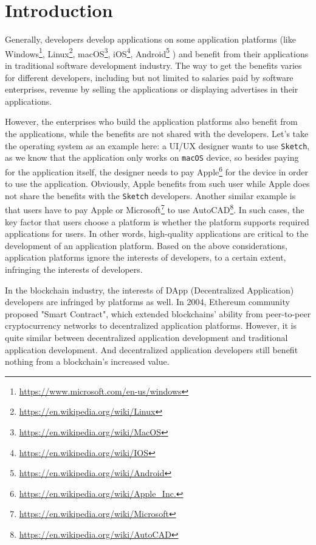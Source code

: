 \section{Introduction}

Generally, developers develop applications on some application platforms (like
Windows\footnote{\url{https://www.microsoft.com/en-us/windows}}, Linux\footnote{\url{https://en.wikipedia.org/wiki/Linux}},
macOS\footnote{\url{https://en.wikipedia.org/wiki/MacOS}},
iOS\footnote{\url{https://en.wikipedia.org/wiki/IOS}},
Android\footnote{\url{https://en.wikipedia.org/wiki/Android}} \etc) and
benefit from their applications in traditional software development industry.
The way to get the benefits varies for different developers, including but not
limited to salaries paid by software enterprises, revenue by selling the
applications or displaying advertises in their applications.

However, the enterprises who build the application platforms also benefit
from the applications, while the benefits are not shared with the developers.
Let's take the operating system as an example here: a UI/UX designer wants to use \texttt{Sketch},
as we know that the application only works on \texttt{macOS} device, so besides
paying for the application itself, the designer needs to pay Apple\footnote{\url{https://en.wikipedia.org/wiki/Apple_Inc.}}
for the device in order to use the application. Obviously, Apple benefits from such user while
Apple does not share the benefits with the \texttt{Sketch} developers.
Another similar example is that users have to pay Apple or
Microsoft\footnote{\url{https://en.wikipedia.org/wiki/Microsoft}} to use
AutoCAD\footnote{\url{https://en.wikipedia.org/wiki/AutoCAD}}. In such cases,
the key factor that users choose a platform is whether the platform
supports required applications for users. In other words, high-quality
applications are critical to the development of an application platform. Based on the above considerations,  application platforms ignore the interests of developers, to a certain extent, infringing the interests of developers.

In the blockchain industry, the interests of
DApp (Decentralized Application) developers are infringed by platforms  as  well.
 In 2004, Ethereum community proposed "Smart Contract",
which extended blockchains' ability from peer-to-peer
cryptocurrency networks to decentralized application platforms. However, it is
quite similar between decentralized application development and traditional
application development. And decentralized application developers still benefit
nothing from a blockchain's increased value.


